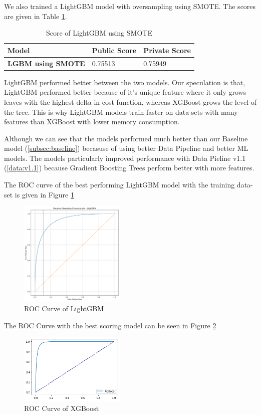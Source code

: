 \documentclass[sigconf, nonacm]{acmart}
\begin{document}
We also trained a LightGBM model with oversampling using SMOTE. The scores are given in Table \ref{tab:lgb_smote}.

\begin{table}[h]
	\caption{Score of LightGBM using SMOTE}
	\label{tab:lgb_smote}
	\begin{tabular}{@{}|l|l|l|@{}}
		\toprule
		\textbf{Model}            & \textbf{Public Score} & \textbf{Private Score} \\ \midrule
		\textbf{LGBM using SMOTE} & 0.75513               & 0.75949                \\ \bottomrule
	\end{tabular}
\end{table} 

LightGBM performed better between the two models. Our speculation is that, LightGBM performed better because of it's unique feature where it only grows leaves with the highest delta in cost function, whereas XGBoost grows the level of the tree. This is why LightGBM models train faster on data-sets with many features than XGBoost with lower memory consumption.

Although we can see that the models performed much better than our Baseline model (\ref{subsec:baseline}) becasuse of using better Data Pipeline and better ML models. The models particularly improved performance with Data Pieline v1.1 (\ref{data:v1.1}) because Gradient Boosting Trees perform better with more features.

The ROC curve of the best performing LightGBM model with the training data-set is given in Figure \ref{fig:lgb_roc}

\begin{figure}[h]
	\centering
	\includegraphics[width=0.45\textwidth]{lgb/roc}
	\caption{ROC Curve of LightGBM}
	\label{fig:lgb_roc}
\end{figure}

The ROC Curve with the best scoring model can be seen in Figure \ref{fig:xgb_roc}
\begin{figure}[h]
	\centering
	\includegraphics[width=0.45\textwidth]{xgb/roc.png}
	\caption{ROC Curve of XGBoost}
	\label{fig:xgb_roc}
\end{figure}
\end{document}
